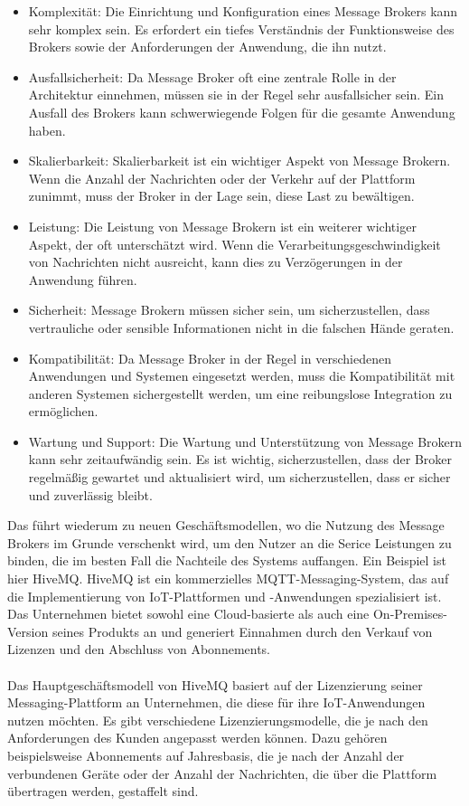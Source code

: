 \begin{itemize}
\item Komplexität: Die Einrichtung und Konfiguration eines Message Brokers kann sehr komplex sein. Es erfordert ein tiefes Verständnis der Funktionsweise des Brokers sowie der Anforderungen der Anwendung, die ihn nutzt.
\item Ausfallsicherheit: Da Message Broker oft eine zentrale Rolle in der Architektur einnehmen, müssen sie in der Regel sehr ausfallsicher sein. Ein Ausfall des Brokers kann schwerwiegende Folgen für die gesamte Anwendung haben.
\item Skalierbarkeit: Skalierbarkeit ist ein wichtiger Aspekt von Message Brokern. Wenn die Anzahl der Nachrichten oder der Verkehr auf der Plattform zunimmt, muss der Broker in der Lage sein, diese Last zu bewältigen.
\item Leistung: Die Leistung von Message Brokern ist ein weiterer wichtiger Aspekt, der oft unterschätzt wird. Wenn die Verarbeitungsgeschwindigkeit von Nachrichten nicht ausreicht, kann dies zu Verzögerungen in der Anwendung führen.
\item Sicherheit: Message Brokern müssen sicher sein, um sicherzustellen, dass vertrauliche oder sensible Informationen nicht in die falschen Hände geraten.
\item Kompatibilität: Da Message Broker in der Regel in verschiedenen Anwendungen und Systemen eingesetzt werden, muss die Kompatibilität mit anderen Systemen sichergestellt werden, um eine reibungslose Integration zu ermöglichen.
\item Wartung und Support: Die Wartung und Unterstützung von Message Brokern kann sehr zeitaufwändig sein. Es ist wichtig, sicherzustellen, dass der Broker regelmäßig gewartet und aktualisiert wird, um sicherzustellen, dass er sicher und zuverlässig bleibt.
\end{itemize}
Das führt wiederum zu neuen Geschäftsmodellen, wo die Nutzung des Message Brokers im Grunde verschenkt wird, um den Nutzer an die Serice Leistungen zu binden, die im besten Fall die Nachteile des Systems auffangen. 
Ein Beispiel ist hier HiveMQ. HiveMQ ist ein kommerzielles MQTT-Messaging-System, das auf die Implementierung von IoT-Plattformen und -Anwendungen spezialisiert ist. Das Unternehmen bietet sowohl eine Cloud-basierte als auch eine On-Premises-Version seines Produkts an und generiert Einnahmen durch den Verkauf von Lizenzen und den Abschluss von Abonnements.
\\\\
Das Hauptgeschäftsmodell von HiveMQ basiert auf der Lizenzierung seiner Messaging-Plattform an Unternehmen, die diese für ihre IoT-Anwendungen nutzen möchten. Es gibt verschiedene Lizenzierungsmodelle, die je nach den Anforderungen des Kunden angepasst werden können. Dazu gehören beispielsweise Abonnements auf Jahresbasis, die je nach der Anzahl der verbundenen Geräte oder der Anzahl der Nachrichten, die über die Plattform übertragen werden, gestaffelt sind.

